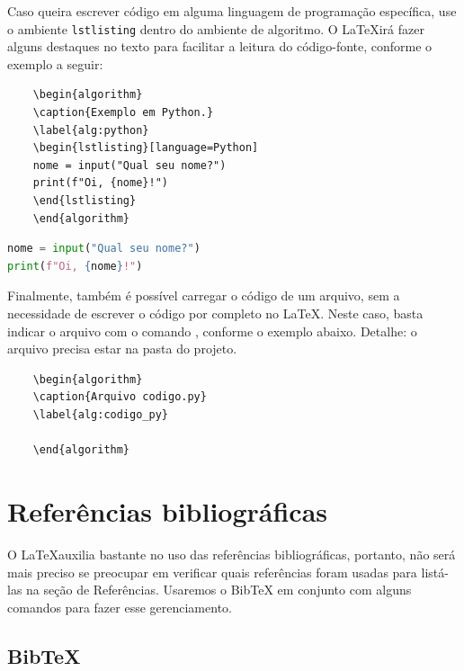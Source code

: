 Caso queira escrever código em alguma linguagem de programação específica, use o ambiente \verb=lstlisting= dentro do ambiente de algoritmo. O \LaTeX\space irá fazer alguns destaques no texto para facilitar a leitura do código-fonte, conforme o exemplo a seguir:

\begin{verbatim}
    \begin{algorithm}
    \caption{Exemplo em Python.}
    \label{alg:python}
    \begin{lstlisting}[language=Python]
    nome = input("Qual seu nome?")
    print(f"Oi, {nome}!")
    \end{lstlisting}
    \end{algorithm}
\end{verbatim}

\begin{algorithm}
\caption{Exemplo em Python.}
\label{alg:python}
\begin{lstlisting}[language=Python]
nome = input("Qual seu nome?")
print(f"Oi, {nome}!")
\end{lstlisting}
\end{algorithm}

Finalmente, também é possível carregar o código de um arquivo, sem a necessidade de escrever o código por completo no \LaTeX. Neste caso, basta indicar o arquivo com o comando \verb==, conforme o exemplo abaixo. Detalhe: o arquivo precisa estar na pasta do projeto.

\begin{verbatim}
    \begin{algorithm}
    \caption{Arquivo codigo.py}
    \label{alg:codigo_py}
    
    \end{algorithm}
\end{verbatim}

\section{Referências bibliográficas}
\label{sec:referencias_bibliograficas}

O \LaTeX\space auxilia bastante no uso das referências bibliográficas, portanto, não será mais preciso se preocupar em verificar quais referências foram usadas para listá-las na seção de Referências. Usaremos o BibTeX em conjunto com alguns comandos para fazer esse gerenciamento.

\subsection{BibTeX}
\label{subsec:bibtex}

